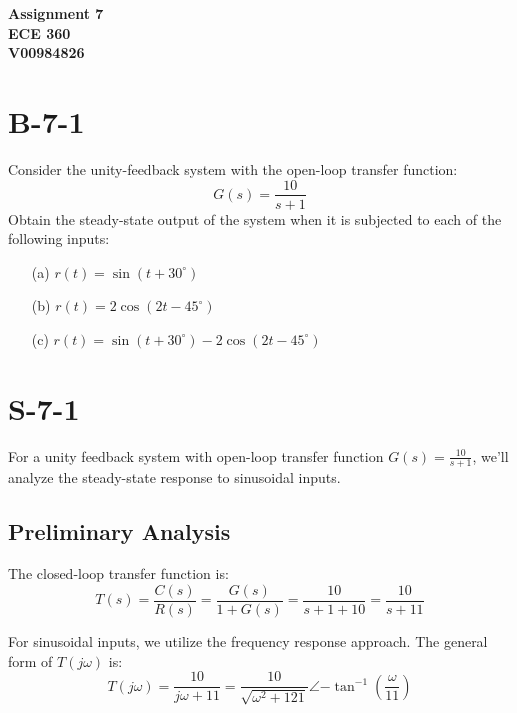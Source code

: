 \documentclass{article}
\begin{document}
\begin{center}
    \textbf{\LARGE Assignment 7} \\[1ex]
    \textbf{ECE 360} \\[1ex]
    \textbf{V00984826} \\[2ex]
\end{center}


\section*{B-7-1}

Consider the unity-feedback system with the open-loop transfer function:
\[
G(s) = \frac{10}{s + 1}
\]
Obtain the steady-state output of the system when it is subjected to each of the following inputs:

\begin{itemize}
    \item[(a)] \( r(t) = \sin \left( t + 30^\circ \right) \)
    \item[(b)] \( r(t) = 2 \cos \left( 2t - 45^\circ \right) \)
    \item[(c)] \( r(t) = \sin \left( t + 30^\circ \right) - 2 \cos \left( 2t - 45^\circ \right) \)
\end{itemize}


\section*{S-7-1}

For a unity feedback system with open-loop transfer function $G(s) = \frac{10}{s + 1}$, we'll analyze the steady-state response to sinusoidal inputs.

\subsection*{Preliminary Analysis}
The closed-loop transfer function is:
\[
T(s) = \frac{C(s)}{R(s)} = \frac{G(s)}{1 + G(s)} = \frac{10}{s + 1 + 10} = \frac{10}{s + 11}
\]

For sinusoidal inputs, we utilize the frequency response approach. The general form of $T(j\omega)$ is:
\[
T(j\omega) = \frac{10}{j\omega + 11} = \frac{10}{\sqrt{\omega^2 + 121}}\angle{-\tan^{-1}\left(\frac{\omega}{11}\right)}
\]
\end{document}
